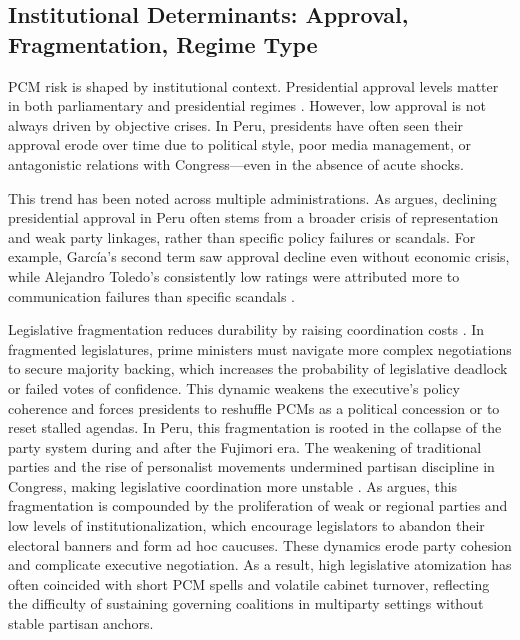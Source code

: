 \documentclass[a4paper, 12pt]{article}
\begin{document}
\subsection{Institutional Determinants: Approval, Fragmentation, Regime Type}

PCM risk is shaped by institutional context. Presidential approval levels matter in both parliamentary and presidential regimes \citep{fischer_duration_2012}. However, low approval is not always driven by objective crises. In Peru, presidents have often seen their approval erode over time due to political style, poor media management, or antagonistic relations with Congress—even in the absence of acute shocks.

This trend has been noted across multiple administrations. As \citet{tanaka_democracia_2005} argues, declining presidential approval in Peru often stems from a broader crisis of representation and weak party linkages, rather than specific policy failures or scandals. For example, García's second term saw approval decline even without economic crisis, while Alejandro Toledo’s consistently low ratings were attributed more to communication failures than specific scandals \citep{tanaka_democracia_2005, levitsky_latin_1999}.

Legislative fragmentation reduces durability by raising coordination costs \citep{huber_replacing_2008}. In fragmented legislatures, prime ministers must navigate more complex negotiations to secure majority backing, which increases the probability of legislative deadlock or failed votes of confidence. This dynamic weakens the executive’s policy coherence and forces presidents to reshuffle PCMs as a political concession or to reset stalled agendas. In Peru, this fragmentation is rooted in the collapse of the party system during and after the Fujimori era. The weakening of traditional parties and the rise of personalist movements undermined partisan discipline in Congress, making legislative coordination more unstable \citep{levitsky_latin_1999, tanaka_democracia_2005, garcia_marin_fragmentacion_2024}. As \citet{garcia_marin_fragmentacion_2024} argues, this fragmentation is compounded by the proliferation of weak or regional parties and low levels of institutionalization, which encourage legislators to abandon their electoral banners and form ad hoc caucuses. These dynamics erode party cohesion and complicate executive negotiation. As a result, high legislative atomization has often coincided with short PCM spells and volatile cabinet turnover, reflecting the difficulty of sustaining governing coalitions in multiparty settings without stable partisan anchors.
\end{document}
